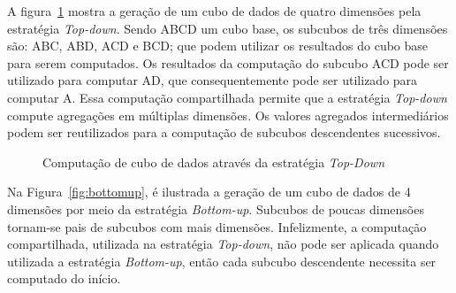 A figura~\ref{fig:topdown} mostra a geração de um cubo de dados de quatro dimensões pela estratégia \textit{Top-down}.
Sendo ABCD um cubo base, os subcubos de três dimensões são: ABC, ABD, ACD e BCD; que podem utilizar os resultados do cubo base para serem computados.
Os resultados da computação do subcubo ACD pode ser utilizado para computar AD, que consequentemente pode ser utilizado para computar A.
Essa computação compartilhada permite que a estratégia \textit{Top-down} compute agregações em múltiplas dimensões.
Os valores agregados intermediários podem ser reutilizados para a computação de subcubos descendentes sucessivos.

\begin{figure}[!htb]
	\caption{Computação de cubo de dados através da estratégia \textit{Top-Down}}\label{fig:topdown}
	\vspace{4mm}
	\begin{center}
	\end{center}
	\vspace{2mm}
	\legenda{}
\end{figure}

Na Figura~\ref{fig:bottomup}, é ilustrada a geração de um cubo de dados de 4 dimensões por meio da estratégia \textit{Bottom-up}.
Subcubos de poucas dimensões tornam-se pais de subcubos com mais dimensões.
Infelizmente, a computação compartilhada, utilizada na estratégia \textit{Top-down}, não pode ser aplicada quando utilizada a estratégia \textit{Bottom-up}, então cada subcubo descendente necessita ser computado do início.

